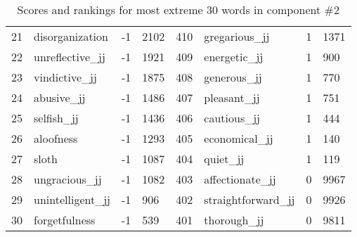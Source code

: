 \begin{table}[tbp]
\begin{tabular}{| rlr@{.}l | rlr@{.}l |}
    21 & disorganization & -1 & 2102    &    410 & gregarious\_jj & 1 & 1371 \\
    22 & unreflective\_jj & -1 & 1921    &    409 & energetic\_jj & 1 & 900 \\
    23 & vindictive\_jj & -1 & 1875    &    408 & generous\_jj & 1 & 770 \\
    24 & abusive\_jj & -1 & 1486    &    407 & pleasant\_jj & 1 & 751 \\
    25 & selfish\_jj & -1 & 1436    &    406 & cautious\_jj & 1 & 444 \\
    26 & aloofness & -1 & 1293    &    405 & economical\_jj & 1 & 140 \\
    27 & sloth & -1 & 1087    &    404 & quiet\_jj & 1 & 119 \\
    28 & ungracious\_jj & -1 & 1082    &    403 & affectionate\_jj & 0 & 9967 \\
    29 & unintelligent\_jj & -1 & 906    &    402 & straightforward\_jj & 0 & 9926 \\
    30 & forgetfulness & -1 & 539    &    401 & thorough\_jj & 0 & 9811 \\
    \hline
    \end{tabular}
    \caption{Scores and rankings for most extreme 30 words in component \#2} 
\end{table}
\clearpage
